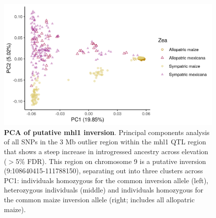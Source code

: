 \begin{figure}[ht]
\includegraphics[width=\textwidth]{chapter2/figures/mhl1_inv_pca.png}
\caption{\color{Gray} \textbf{PCA of putative mhl1 inversion}. Principal components analysis of all SNPs in the 3 Mb outlier region within the mhl1 QTL region that shows a steep increase in introgressed \mexicana ancestry across elevation ($>$5\% FDR). This region on chromosome 9 is a putative inversion (9:108640415-111788150), separating out into three clusters across PC1: individuals homozygous for the common \mexicana inversion allele (left), heterozygous individuals (middle) and individuals homozygous for the common maize inversion allele (right; includes all allopatric  maize).}
\label{mhl1_pca}
\end{figure}

